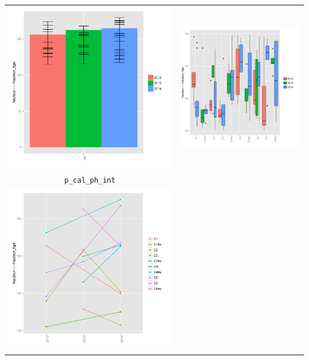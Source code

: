 \documentclass{article}\usepackage[]{graphicx}\usepackage[]{color}
\newenvironment{knitrout}{}{} %
\begin{document}
\begin{itemize}
\begin{itemize}
\begin{center}
\begin{tabular}{cc}
\begin{knitrout}
{\centering \includegraphics[width=.4\textwidth]{figures/shinemas2R_unnamed-chunk-71-1} 

}



\end{knitrout}
&
\begin{knitrout}
\definecolor{shadecolor}{rgb}{0.969, 0.969, 0.969}\color{fgcolor}

{\centering \includegraphics[width=.4\textwidth]{figures/shinemas2R_unnamed-chunk-72-1} 

}



\end{knitrout}
\\
\texttt{p\_cal\_ph\_int} & \\
\begin{knitrout}
\definecolor{shadecolor}{rgb}{0.969, 0.969, 0.969}\color{fgcolor}

{\centering \includegraphics[width=.4\textwidth]{figures/shinemas2R_unnamed-chunk-73-1} 

}
\end{knitrout}
\end{tabular}
\end{center}
\end{itemize}
\end{itemize}
\end{document}
